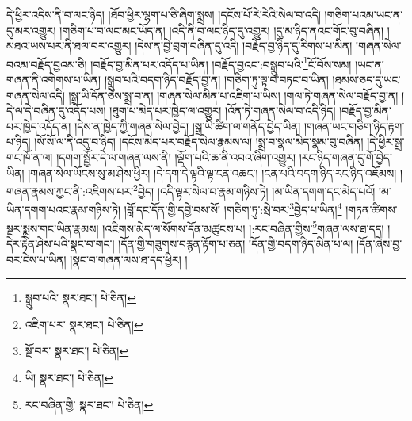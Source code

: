 དེ་ཕྱིར་འདིས་ནི་བ་ལང་ཉིད། །ཐོབ་ཕྱིར་ལྷག་པ་ཅི་ཞིག་སྨྲས། །དངོས་པོ་རེ་རེའི་སེལ་བ་འདི། །གཅིག་པའམ་ཡང་ན་དུ་མར་འགྱུར། །གཅིག་པ་བ་ལང་མང་ཡོད་ན། །འདི་ནི་བ་ལང་ཉིད་དུ་འགྱུར། །དུ་མ་ཉིད་ནའང་གོང་བུ་བཞིན། །མཐའ་ཡས་པར་ནི་ཐལ་བར་འགྱུར། །དེས་ན་བྱེ་བྲག་བཞིན་དུ་འདི། །བརྗོད་བྱ་ཉིད་དུ་རིགས་པ་མིན། །གཞན་སེལ་བའམ་བརྗོད་བྱའམ་ཅི། །བརྗོད་བྱ་མིན་པར་འདོད་པ་ཡིན། །བརྗོད་བྱའང་:བསྒྲུབ་པའི་\footnote{སྒྲུབ་པའི་  སྣར་ཐང་།  པེ་ཅིན། }ངོ་བོས་སམ། །ཡང་ན་གཞན་ནི་འགེགས་པ་ཡིན། །སྒྲུབ་པའི་བདག་ཉིད་བརྗོད་བྱ་ན། །གཅིག་ཏུ་ལྟ་བ་བཏང་བ་ཡིན། །ཐམས་ཅད་དུ་ཡང་གཞན་སེལ་འདི། །སྒྲ་ཡི་དོན་ཅེས་སྨྲ་བ་ན། །གཞན་སེལ་མིན་པ་འཇིག་པ་ཡིས། །གལ་ཏེ་གཞན་སེལ་བརྗོད་བྱ་ན། །དེ་ལ་དེ་བཞིན་དུ་འདོད་པས། །ཐུག་པ་མེད་པར་ཁྱེད་ལ་འགྱུར། །འོན་ཏེ་གཞན་སེལ་བ་འདི་ཉིད། །བརྗོད་བྱ་མིན་པར་ཁྱེད་འདོད་ན། །དེས་ན་ཁྱེད་ཀྱི་གཞན་སེལ་བྱེད། །སྒྲ་ཡི་ཚིག་ལ་གནོད་བྱེད་ཡིན། །གཞན་ཡང་གཅིག་ཉིད་རྟག་པ་ཉིད། །སོ་སོ་ལ་ནི་འདུ་བ་ཉིད། །དངོས་མེད་པར་བརྗོད་སེལ་རྣམས་ལ། །སྨྲ་བ་སྣལ་མེད་སྣམ་བུ་བཞིན། །དེ་ཕྱིར་སྒྲ་གང་ཁོ་ན་ལ། །དགག་སྦྱོར་དེ་ལ་གཞན་ལས་ནི། །ལྡོག་པའི་ཆ་ནི་འབའ་ཞིག་འགྱུར། །རང་ཉིད་གཞན་དུ་གོ་བྱེད་ཡིན། །གཞན་སེལ་ཡོངས་སུ་མ་ཤེས་ཕྱིར། །དེ་དག་དེ་ལྟའི་ལྟ་ངན་འཆང་། །ངན་པའི་བདག་ཉིད་རང་ཉིད་འཇོམས། །གཞན་རྣམས་ཀྱང་ནི་:འཇིགས་པར་\footnote{འཇིག་པར་  སྣར་ཐང་།  པེ་ཅིན། }བྱེད། །འདི་ལྟར་སེལ་བ་རྣམ་གཉིས་ཏེ། །མ་ཡིན་དགག་དང་མེད་པའོ། །མ་ཡིན་དགག་པའང་རྣམ་གཉིས་ཏེ། །བློ་དང་དོན་གྱི་དབྱེ་བས་སོ། །གཅིག་ཏུ་:སྲེ་བར་\footnote{སྔོ་བར་  སྣར་ཐང་།  པེ་ཅིན། }བྱེད་པ་ཡིན།\footnote{ཡི།  སྣར་ཐང་།  པེ་ཅིན། } །གཏན་ཚིགས་སྔར་སྨྲས་གང་ཡིན་རྣམས། །འཇིགས་མེད་ལ་སོགས་དོན་མཚུངས་པ། །:རང་བཞིན་གྱིས་\footnote{རང་བཞིན་གྱི་  སྣར་ཐང་།  པེ་ཅིན། }གཞན་ལས་ཐ་དད། །དེར་རྟེན་ཤེས་པའི་སྣང་བ་གང་། །དོན་གྱི་གཟུགས་བརྙན་རྟོག་པ་ཅན། །དོན་གྱི་བདག་ཉིད་མིན་པ་ལ། །དོན་ཞེས་བྱ་བར་ངེས་པ་ཡིན། །སྣང་བ་གཞན་ལས་ཐ་དད་ཕྱིར། །

